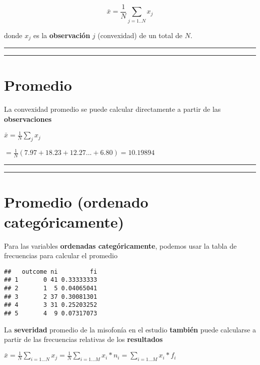 \documentclass[
]{book}
\begin{document}
\[\bar{x}=\frac{1}{N} \sum_{j=1..N} x_j\]

donde \(x_j\) es la \textbf{observación} \(j\) (convexidad) de un total de \(N\).

\begin{center}\rule{0.5\linewidth}{0.5pt}\end{center}

\begin{center}\rule{0.5\linewidth}{0.5pt}\end{center}

\hypertarget{promedio}{%
\section{Promedio}\label{promedio}}

La convexidad promedio se puede calcular directamente a partir de las \textbf{observaciones}

\(\bar{x}= \frac{1}{N}\sum_j x_j\)

\(= \frac{1}{N}(7.97 + 18.23 + 12.27... + 6.80) = 10.19894\)

\begin{center}\rule{0.5\linewidth}{0.5pt}\end{center}

\begin{center}\rule{0.5\linewidth}{0.5pt}\end{center}

\hypertarget{promedio-ordenado-categuxf3ricamente}{%
\section{Promedio (ordenado categóricamente)}\label{promedio-ordenado-categuxf3ricamente}}

Para las variables \textbf{ordenadas categóricamente}, podemos usar la tabla de frecuencias para calcular el promedio

\begin{verbatim}
##   outcome ni         fi
## 1       0 41 0.33333333
## 2       1  5 0.04065041
## 3       2 37 0.30081301
## 4       3 31 0.25203252
## 5       4  9 0.07317073
\end{verbatim}

La \textbf{severidad} promedio de la misofonía en el estudio
\textbf{también} puede calcularse a partir de las frecuencias relativas de los \textbf{resultados}

\(\bar{x}=\frac{1}{N}\sum_{i=1...N} x_j=\frac{1}{N}\sum_{i=1...M} x_i*n_ {i}=\sum_{i=1...M} x_i*f_{i}\)
\end{document}
